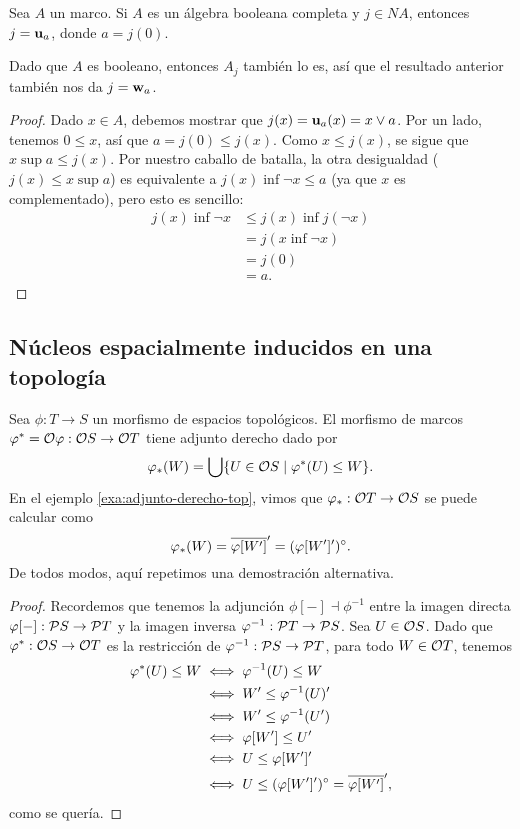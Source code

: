 \begin{thm}
  Sea $A$ un marco.
  Si $A$ es un álgebra booleana completa y $j\in NA$,
  entonces $j=\unuc a$, donde $a=j(0)$.
  
  Dado que $A$ es booleano, entonces $A_j$ también lo es,
  así que el resultado anterior también nos da $j=\wnuc a$.
\end{thm}
\begin{proof}
    Dado $x\in A$, debemos mostrar que $j(x)=\unuc a(x)=x\sup a$.
    Por un lado, tenemos $0\leq x$, así que $a=j(0)\leq j(x)$.
    Como $x\leq j(x)$, se sigue que $x\sup a\leq j(x)$.
    Por nuestro caballo de batalla, la otra desigualdad
    ($j(x)\leq x\sup a$) es equivalente a $j(x)\inf \neg x\leq a$
    (ya que $x$ es complementado), pero esto es sencillo:
    \begin{align*}
        j(x)\inf\neg x
        &\leq j(x)\inf j(\neg x) \\
        &= j(x\inf\neg x) \\
        &= j(0) \\
        &= a.
    \end{align*}
\end{proof}

\subsection{Núcleos espacialmente inducidos en una topología}

Sea $\phi:T\to S$ un morfismo de espacios topológicos.
El morfismo de marcos $\phi^*=\cal O\phi:\cal OS\to\cal OT$
tiene adjunto derecho dado por
\[
  \phi_*(W)
  = \bigcup\{U\in\cal OS \mid \phi^*(U) \leq W\}
.\]
En el ejemplo \ref{exa:adjunto-derecho-top}, vimos que
$\phi_*:\cal OT\to\cal OS$ se puede calcular como
\[
  \phi_*(W) = \ol{\phi[W']}' = (\phi[W']')^\circ
.\]
De todos modos, aquí repetimos una demostración alternativa.
\begin{proof}
  Recordemos que tenemos la adjunción $\phi[-]\dashv\phi^{-1}$
  entre la imagen directa $\phi[-]:\cal PS\to\cal PT$ y la imagen
  inversa $\phi^{-1}:\cal PT\to\cal PS$.
  Sea $U\in\cal OS$.
  Dado que $\phi^*:\cal OS\to\cal OT$ es la restricción de
  $\phi^{-1}:\cal PS\to\cal PT$, para todo $W\in\cal OT$, tenemos
  \begin{align*}
      \phi^*(U)\leq W
      &\iff \phi^{-1}(U)\leq W \\
      &\iff W'\leq \phi^{-1}(U)' \\
      &\iff W'\leq \phi^{-1}(U') \\
      &\iff \phi[W'] \leq U' \\
      &\iff U\leq \phi[W']' \\
      &\iff U\leq (\phi[W']')^\circ = \ol{\phi[W']}',
  \end{align*}
  como se quería.
\end{proof}

